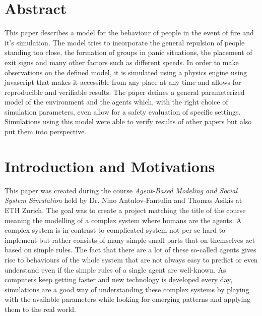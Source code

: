 \documentclass[11pt]{article}
\begin{document}






\tableofcontents

\newpage




\section{Abstract}

This paper describes a model for the behaviour of people in the event of fire and it's simulation. The model tries to incorporate the general repulsion of people standing too close, the formation of groups in panic situations, the placement of exit signs and many other factors such as different speeds. In order to make observations on the defined model, it is simulated using a physics engine using javascript that makes it accessible from any place at any time and allows for reproducible and verifiable results. The paper defines a general parameterized model of the environment and the agents which, with the right choice of simulation parameters, even allow for a safety evaluation of specific settings. Simulations using this model were able to verify results of other papers but also put them into perspective.

\section{Introduction and Motivations}

This paper was created during the course \textit{Agent-Based Modeling and Social System Simulation} held by Dr. Nino Antulov-Fantulin and Thomas Asikis at ETH Zurich. The goal was to create a project matching the title of the course meaning the modelling of a complex system where humans are the agents. A complex system is in contrast to complicated system not per se hard to implement but rather consists of many simple small parts that on themselves act based on simple rules. The fact that there are a lot of these so-called agents gives rise to behaviours of the whole system that are not always easy to predict or even understand even if the simple rules of a single agent are well-known. As computers keep getting faster and new technology is developed every day, simulations are a good way of understanding these complex systems by playing with the available parameters while looking for emerging patterns and applying them to the real world.
\end{document}
